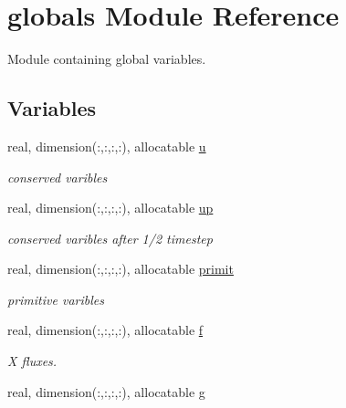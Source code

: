 \hypertarget{namespaceglobals}{}\section{globals Module Reference}
\label{namespaceglobals}


Module containing global variables.  


\subsection*{Variables}
\begin{DoxyCompactItemize}
\item 
\hypertarget{namespaceglobals_ae6519b751f8ef608c2074e27024335b7}{}real, dimension(\+:,\+:,\+:,\+:), allocatable \hyperlink{namespaceglobals_ae6519b751f8ef608c2074e27024335b7}{u}\label{namespaceglobals_ae6519b751f8ef608c2074e27024335b7}

\begin{DoxyCompactList}\small\item\em conserved varibles \end{DoxyCompactList}\item 
\hypertarget{namespaceglobals_a127abb71c460a346ae47d10d86c22cc9}{}real, dimension(\+:,\+:,\+:,\+:), allocatable \hyperlink{namespaceglobals_a127abb71c460a346ae47d10d86c22cc9}{up}\label{namespaceglobals_a127abb71c460a346ae47d10d86c22cc9}

\begin{DoxyCompactList}\small\item\em conserved varibles after 1/2 timestep \end{DoxyCompactList}\item 
\hypertarget{namespaceglobals_a149bece4e7407071629f69a8c7deb03a}{}real, dimension(\+:,\+:,\+:,\+:), allocatable \hyperlink{namespaceglobals_a149bece4e7407071629f69a8c7deb03a}{primit}\label{namespaceglobals_a149bece4e7407071629f69a8c7deb03a}

\begin{DoxyCompactList}\small\item\em primitive varibles \end{DoxyCompactList}\item 
\hypertarget{namespaceglobals_a5fb85172ca54e822fdb8c522da890717}{}real, dimension(\+:,\+:,\+:,\+:), allocatable \hyperlink{namespaceglobals_a5fb85172ca54e822fdb8c522da890717}{f}\label{namespaceglobals_a5fb85172ca54e822fdb8c522da890717}

\begin{DoxyCompactList}\small\item\em X fluxes. \end{DoxyCompactList}\item 
\hypertarget{namespaceglobals_a0124c44fda4a3092edd2789f79dec648}{}real, dimension(\+:,\+:,\+:,\+:), allocatable \hyperlink{namespaceglobals_a0124c44fda4a3092edd2789f79dec648}{g}\label{namespaceglobals_a0124c44fda4a3092edd2789f79dec648}


\end{DoxyCompactItemize}

